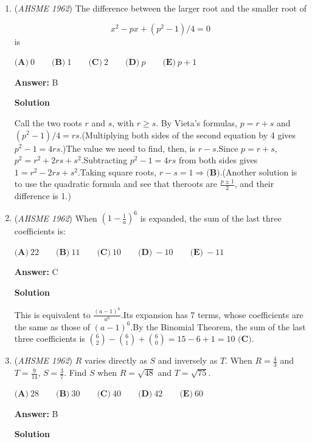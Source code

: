 \begin{enumerate}
	\item (\textit{AHSME 1962}) The difference between the larger root and the smaller root of

 \[x^2 - px + (p^2 - 1)/4 = 0\]
is


 $\textbf{(A)}\ 0 \qquad  \textbf{(B)}\ 1 \qquad  \textbf{(C)}\ 2 \qquad  \textbf{(D)}\ p \qquad  \textbf{(E)}\ p + 1$

 \textbf{Answer: }B



\textbf{Solution}

Call the two roots $r$ and $s$, with $r \ge s$. By Vieta's formulas, $p=r+s$ and $(p^2-1)/4=rs.$(Multiplying both sides of the second equation by 4 gives $p^2-1=4rs$.)The value we need to find, then, is $r-s$.Since $p=r+s$, $p^2=r^2+2rs+s^2$.Subtracting $p^2-1=4rs$ from both sides gives $1=r^2-2rs+s^2$.Taking square roots, $r-s=1 \Rightarrow \boxed{\textbf{(B)}}$.(Another solution is to use the quadratic formula and see that theroots are $\frac{p\pm 1}2$, and their difference is 1.)

 


	\item (\textit{AHSME 1962}) When $\left(1 - \frac{1}{a}\right)^6$ is expanded, the sum of the last three coefficients is:


 $\textbf{(A)}\ 22 \qquad  \textbf{(B)}\ 11 \qquad  \textbf{(C)}\ 10 \qquad  \textbf{(D)}\ -10 \qquad  \textbf{(E)}\ -11$

 \textbf{Answer: }C



\textbf{Solution}

This is equivalent to $\frac{(a-1)^6}{a^6}.$Its expansion has 7 terms, whose coefficients are the same as those of $(a-1)^6$.By the Binomial Theorem, the sum of the last three coefficients is $\binom{6}{2}-\binom{6}{1}+\binom{6}{0}=15-6+1=\boxed{10 \textbf{ (C)}}$.

 


	\item (\textit{AHSME 1962}) $R$ varies directly as $S$ and inversely as $T$. When $R = \frac{4}{3}$ and $T = \frac{9}{14}$, $S = \frac{3}{7}$. Find $S$ when $R = \sqrt{48}$ and $T = \sqrt{75}$.


 $\textbf{(A)}\ 28 \qquad  \textbf{(B)}\ 30 \qquad  \textbf{(C)}\ 40 \qquad  \textbf{(D)}\ 42 \qquad  \textbf{(E)}\ 60$

 \textbf{Answer: }B



\textbf{Solution}



\end{enumerate}
